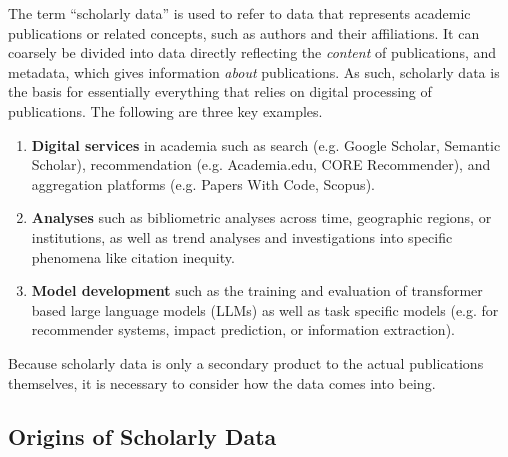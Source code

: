 The term ``scholarly data'' is used to refer to data that represents academic publications or related concepts, such as authors and their affiliations. It can coarsely be divided into data directly reflecting the \emph{content} of publications, and metadata, which gives information \emph{about} publications.
As such, scholarly data is the basis for essentially everything that relies on digital processing of publications. The following are three key examples.
\begin{enumerate}
    \item \textbf{Digital services} in academia such as search (e.g. Google Scholar, Semantic Scholar), recommendation (e.g. Academia.edu, CORE Recommender), and aggregation platforms (e.g. Papers With Code, Scopus).  %
    \item \textbf{Analyses} such as bibliometric analyses across time, geographic regions, or institutions, as well as trend analyses and investigations into specific phenomena like citation inequity.
    \item \textbf{Model development} such as the training and evaluation of transformer based large language models (LLMs) as well as task specific models (e.g. for recommender systems, impact prediction, or information extraction).
\end{enumerate}

Because scholarly data is only a secondary product to the actual publications themselves, it is necessary to consider how the data comes into being.

\subsection{Origins of Scholarly Data}


